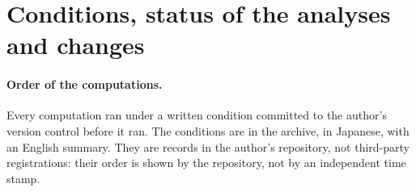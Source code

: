 \renewcommand{\thesection}{S\arabic{section}}
\setcounter{section}{0}

\section{Conditions, status of the analyses and changes}
\label{app:status}

\paragraph{Order of the computations.} Every computation ran under a written condition committed to the author's version
control before it ran. The conditions are in the archive, in Japanese, with an English summary. They are records in
the author's repository, not third-party registrations: their order is shown by the repository, not by an independent
time stamp.

